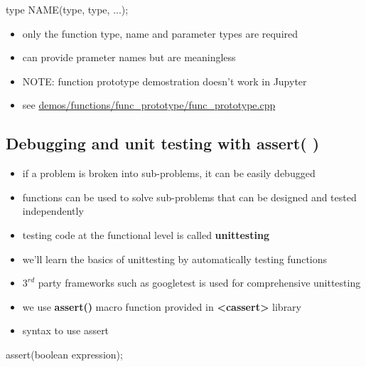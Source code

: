 \documentclass[11pt]{article}
\providecommand{\tightlist}{%
      \setlength{\itemsep}{0pt}\setlength{\parskip}{0pt}}
\newenvironment{Shaded}{}{}
\newcommand{\OtherTok}[1]{\textcolor[rgb]{0.00,0.44,0.13}{{#1}}}
\newcommand{\NormalTok}[1]{{#1}}
\newcommand{\OperatorTok}[1]{\textcolor[rgb]{0.40,0.40,0.40}{{#1}}}
\begin{document}
\begin{Shaded}
\begin{Highlighting}[]
\NormalTok{type NAME}\OperatorTok{(}\NormalTok{type}\OperatorTok{,}\NormalTok{ type}\OperatorTok{,} \OperatorTok{...);}
\end{Highlighting}
\end{Shaded}

\begin{itemize}
\tightlist
\item
  only the function type, name and parameter types are required
\item
  can provide prameter names but are meaningless
\item
  NOTE: function prototype demostration doesn't work in Jupyter
\item
  see \url{demos/functions/func_prototype/func_prototype.cpp}
\end{itemize}

    \hypertarget{debugging-and-unit-testing-with-assert}{%
\subsection{Debugging and unit testing with assert(
)}\label{debugging-and-unit-testing-with-assert}}

\begin{itemize}
\tightlist
\item
  if a problem is broken into sub-problems, it can be easily debugged
\item
  functions can be used to solve sub-problems that can be designed and
  tested independently
\item
  testing code at the functional level is called \textbf{unittesting}
\item
  we'll learn the basics of unittesting by automatically testing
  functions
\item
  \(3^{rd}\) party frameworks such as googletest is used for
  comprehensive unittesting
\item
  we use \textbf{assert()} macro function provided in
  \textbf{\textless cassert\textgreater{}} library
\item
  syntax to use assert
\end{itemize}

\begin{Shaded}
\begin{Highlighting}[]
    \OtherTok{assert}\OperatorTok{(}\NormalTok{boolean expression}\OperatorTok{);}
\end{Highlighting}
\end{Shaded}
\end{document}
